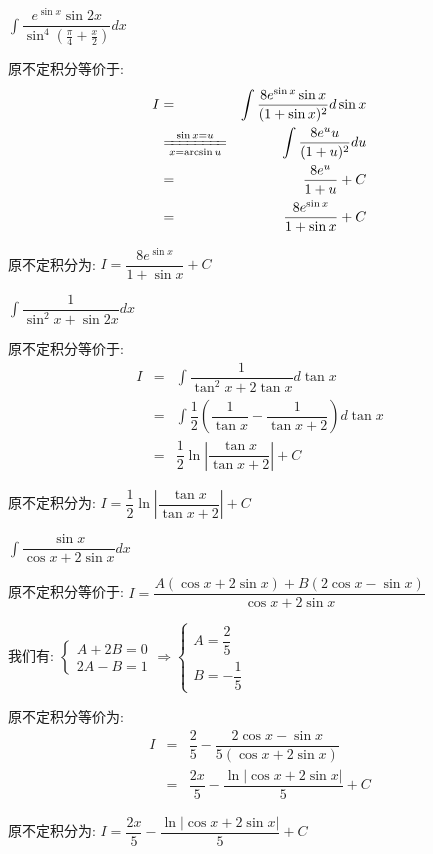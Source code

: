 \begin{proposition}
	$\int \dfrac{e^{\sin x}\sin 2x}{\sin^4(\frac{\pi}{4}+\frac{x}{2})}dx$
\end{proposition}
\begin{solution}
		
	原不定积分等价于:  
	\begin{eqnarray*}
		I&=&\int \dfrac{8e^{\sin x}\sin x}{(1+\sin x)^2}d\sin x\\
		&\xlongequal[x=\arcsin u]{\sin x=u}&\int\dfrac{8e^{u}u}{(1+u)^2}du\\
		&=&\dfrac{8e^u}{1+u}+C \\
		&=&\dfrac{8e^{\sin x}}{1+\sin x}+C
	\end{eqnarray*}
	
	原不定积分为:  $I=\dfrac{8e^{\sin x}}{1+\sin x}+C$
\end{solution}
\begin{proposition}
	$\int \dfrac{1}{\sin^2x+\sin 2x}dx$
\end{proposition}
\begin{solution}
		
	原不定积分等价于:  
	\begin{eqnarray*}
		I&=&\int \dfrac{1}{\tan^2 x+2\tan x}d\tan x\\
		&=&\int\dfrac{1}{2}\left(\dfrac{1}{\tan x}-\dfrac{1}{\tan x+2}\right)d\tan x\\
		&=&\dfrac{1}{2}\ln |\dfrac{\tan x}{\tan x+2}|+C 
	\end{eqnarray*}

原不定积分为:  $I=\dfrac{1}{2}\ln |\dfrac{\tan x}{\tan x+2}|+C $
\end{solution}

\begin{proposition}
	$\int \dfrac{\sin x}{\cos x+2\sin x}dx$
\end{proposition}
\begin{solution}
		
	原不定积分等价于:  $I=\dfrac{A(\cos x+2\sin x)+B(2\cos x-\sin x)}{\cos x+2\sin x}$
	
	我们有:  $\left\lbrace
	\begin{array}{l}
		A+2B=0\\
		2A-B=1
	\end{array}
	\right. \Rightarrow \left\lbrace
	\begin{array}{l}
		A=\dfrac{2}{5}\\
		B=-\dfrac{1}{5}
	\end{array}
	\right. $
	
	原不定积分等价为:  
	\begin{eqnarray*}
		I&=&\dfrac{2}{5}-\dfrac{2\cos x-\sin x}{5(\cos x+2\sin x)}\\
		&=&\dfrac{2x}{5}-\dfrac{\ln |\cos x+2\sin x|}{5}+C
	\end{eqnarray*}

原不定积分为:  $I=\dfrac{2x}{5}-\dfrac{\ln |\cos x+2\sin x|}{5}+C$
\end{solution}





